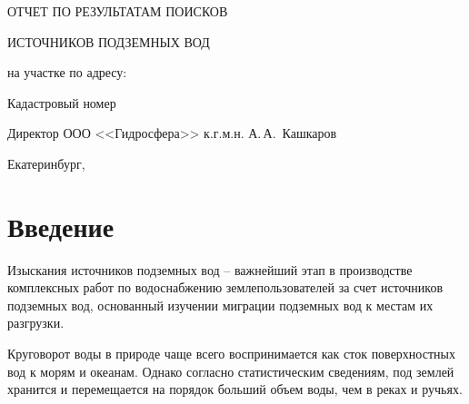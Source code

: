 \begin{titlepage}
	\begin{center}
		\textbf{\txtExecutor}
		\vspace{7.5cm}
		
		{\LARGE ОТЧЕТ ПО РЕЗУЛЬТАТАМ ПОИСКОВ}

		\bigskip

		{\LARGE ИСТОЧНИКОВ ПОДЗЕМНЫХ ВОД}
		
		\bigskip
		
		на участке по адресу:
				
		\underline{\txtAddress}
		
		\bigskip
		Кадастровый номер \txtCadaster
		
		\vfill
	
		\bigskip
		
	\end{center}

	\vfill
	
	\newlength{\ML}
	\hfill
	\begin{minipage}{1.0\textwidth}
		Директор ООО <<Гидросфера>> к.г.м.н.
		\underline{\hspace{\ML}} А.\,А.~Кашкаров\\
	\end{minipage}%
	
	\bigskip
	
	\vfill
	\begin{center}
		Екатеринбург, \txtYear
	\end{center}			

	\end{titlepage}


\section*{Введение}

Изыскания источников подземных вод – важнейший этап в производстве комплексных работ по водоснабжению землепользователей за счет источников подземных вод, основанный изучении миграции подземных вод к местам их разгрузки.

Круговорот воды в природе чаще всего воспринимается как сток поверхностных вод к морям и океанам. Однако согласно статистическим сведениям, под землей хранится и перемещается на порядок больший объем воды, чем в реках и ручьях.

